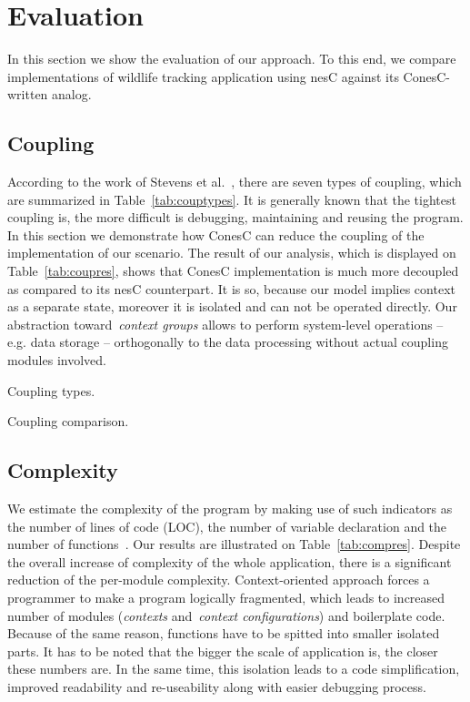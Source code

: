 \section{Evaluation}\label{sec:eval}

In this section we show the evaluation of our approach. To this end, we compare
implementations of wildlife tracking application using nesC against its ConesC-written analog.

\subsection{Coupling}\label{sec:evalcomp}

According to the work of Stevens et al.~\cite{stevens79}, there are seven types
of coupling, which are summarized in Table~\ref{tab:couptypes}. It is generally
known that the tightest coupling is, the more difficult is debugging,
maintaining and reusing the program. In this section we demonstrate how ConesC
can reduce the coupling of the implementation of our scenario. The result of our
analysis, which is displayed on Table~\ref{tab:coupres}, shows that ConesC
implementation is much more decoupled as compared to its nesC counterpart. It is
so, because our model implies context as a separate state, moreover it is
isolated and can not be operated directly. Our abstraction toward~\emph{context
groups} allows to perform system-level operations -- e.g. data storage --
orthogonally to the data processing without actual coupling modules involved.

\begin{table}[!h]
\renewcommand{\arraystretch}{1.3}
\caption{Coupling types.}
\label{tab:couptypes}

\end{table}

\begin{table}[!h]
\renewcommand{\arraystretch}{1.3}
\caption{Coupling comparison.}
\label{tab:coupres}

\end{table}

\subsection{Complexity} 

We estimate the complexity of the program by making use of such indicators as the number of
lines of code (LOC), the number of variable declaration and the number of
functions~\cite{pressman01}. Our results are illustrated on
Table~\ref{tab:compres}. Despite the overall increase of complexity of the whole
application, there is a significant reduction of the per-module complexity.
Context-oriented approach forces a programmer to make a program logically
fragmented, which leads to increased number of modules (\emph{contexts}
and~\emph{context configurations}) and boilerplate code. Because of the same
reason, functions have to be spitted into smaller isolated parts. It has to be
noted that the bigger the scale of application is, the closer these numbers are.
In the same time, this isolation leads to a code simplification, improved
readability and re-useability along with easier debugging process.

